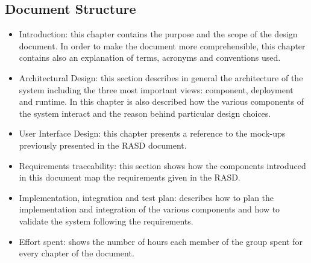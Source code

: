 \subsection{Document Structure}
\begin{itemize}
	\item Introduction: this chapter contains the purpose and the scope of the design document. In order to make the document more comprehensible, this chapter contains also an explanation of terms, acronyms and conventions used.
	\item Architectural Design: this section describes in general the architecture of the system including the three most important views: component, deployment and runtime. In this chapter is also described how the various components of the system interact and the reason behind particular design choices.
	\item User Interface Design: this chapter presents a reference to the mock-ups previously presented in the RASD document.
	\item Requirements traceability: this section shows how the components introduced in this document map the requirements given in the RASD.
	\item Implementation, integration and test plan: describes how to plan the implementation and integration of the various components and how to validate the system following the requirements.
	\item Effort spent: shows the number of hours each member of the group spent for every chapter of the document.
\end{itemize}